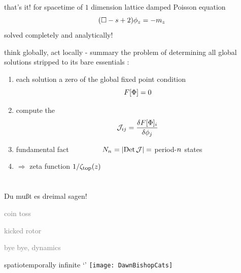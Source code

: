 \begin{frame}{that's it! for spacetime of $1$ dimension}
lattice damped Poisson equation
    {\Huge
\[
 (\Box -s+2)\phi_{z} = - m_z
\] %
    }
\hfill solved completely and analytically!
\end{frame}

\begin{frame}{think globally, act locally - summary}
\bigskip
the problem of determining all global solutions stripped
to its bare essentials :
\bigskip
\begin{enumerate}
              \item
each solution a zero of the global {\color{blue}fixed point} condition
\[
F[\Phi] = 0
\]
              \item
compute  the {\jacobianOrb}
\[
{\cal J}_{ij} =\frac{\delta F[\Phi]_i}{\delta \phi_j}
\]
              \item
{\color{blue}fundamental fact} ~~~~~~~~
\(
N_{n_{}} = |\mbox{\rm Det}\,{\cal J}| =
\)
 period-${n_{}}$ states

 \bigskip
              \item
\hfill $\Rightarrow$ {\color{blue}zeta function} $1/\zeta_{\mbox{\footnotesize top}} (z)$
            \end{enumerate}
\end{frame}

\section[\catlatt]
 {\catlatt}
\label{s:catLatt}

\begin{frame}{}
\begin{bartlett}{
Du mu{\ss}t es dreimal sagen!
        }
\end{bartlett}
\vfill
\begin{enumerate}
              \item \textcolor{gray}{\small
coin toss
              \item
kicked rotor
                  }
              \item {\Large
\catlatt
                  }\textcolor{gray}{\small
              \item
bye bye, dynamics
                    }
            \end{enumerate}
\end{frame}

\begin{frame}{spatiotemporally infinite `\catlatt'}
\hfill\texttt{[image: DawnBishopCats]}
\end{frame}


